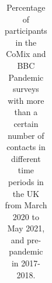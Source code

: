 \documentclass[
  10pt,
  letterpaper,
]{article}
\begin{document}
{

\begin{longtable}[]{@{}
  >{\raggedright\arraybackslash}p{}
  >{\raggedright\arraybackslash}p{}
  >{\raggedright\arraybackslash}p{}
  >{\raggedleft\arraybackslash}p{}
  >{\raggedleft\arraybackslash}p{}
  >{\raggedleft\arraybackslash}p{}
  >{\raggedleft\arraybackslash}p{}
  >{\raggedleft\arraybackslash}p{}
  >{\raggedleft\arraybackslash}p{}
  >{\raggedleft\arraybackslash}p{}@{}}

\caption{\label{tbl-contacts}Percentage of participants in the CoMix and
BBC Pandemic surveys with more than a certain number of contacts in
different time periods in the UK from March 2020 to May 2021, and
pre-pandemic in 2017-2018.}

\tabularnewline


\end{longtable}}
\end{document}
